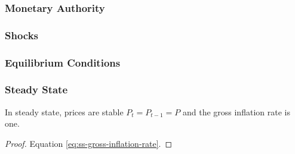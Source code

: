 \documentclass[
thesis.tex
]{subfiles}
\begin{document}

\begin{definition}
	\cite[Lecture 1, p.5]{solis-garcia_ucb_2022}
\end{definition}

\begin{definition}
	\cite[Lecture 1, p.5]{solis-garcia_ucb_2022}
\end{definition}

\subsubsection*{Monetary Authority}

\subsubsection*{Shocks}

\subsubsection*{Equilibrium Conditions}

\begin{definition}
	\cite[Lecture 1, p.6]{solis-garcia_ucb_2022}
\end{definition}


\subsubsection*{Steady State}


\begin{lemma}\label{lemma:steady-state-inflation}
	
	In steady state, prices are stable $P_t = P_{t-1} = P$ and the gross inflation rate is one.
	\begin{proof} Equation \ref{eq:ss-gross-inflation-rate}. \end{proof}  \end{lemma}
\end{document}
